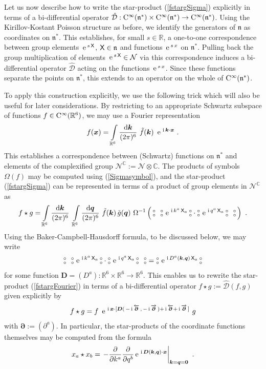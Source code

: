\documentclass[11pt,a4paper]{article}
\newcommand{\NO}{\mbox{$\substack{\circ\\\circ}$}}      %
\newcommand{\mbf}[1]{{\boldsymbol {#1} }}
\def\ii{{\,{\rm i}\,}}
\def\dd{{\rm d}}
\def\CC{{\rm C}}
\def\X{{\sf X}}
\def\mx{{\mbf x}}
\def\mk{{\mbf k}}
\def\mq{{\mbf q}}
\def\mD{{\mbf D}}
\def\mdell{{\mbf\partial}}
\def\mfn{{\mathfrak n}}
\newcommand{\complex}{{\mathbb C}} %
\newcommand{\real}{{\mathbb R}} %
\def\e{{\,\rm e}\,}
\newcommand{\beq}{\begin{eqnarray}}
\newcommand{\eeq}{\end{eqnarray}}
\begin{document}
Let us now describe how to write the star-product (\ref{fstargSigma})
explicitly in terms of a bi-differential operator
$\hat{\mathcal{D}}:\CC^\infty(\mfn^*)\times\CC^\infty(\mfn^*)\to
\CC^\infty(\mfn^*)$. Using the Kirillov-Kostant Poisson structure as
before, we identify the generators of $\mfn$ as coordinates on
$\mfn^*$. This establishes, for small $s\in\real$, a one-to-one
correspondence between group elements $\e^{s\,\X}$, $\X\in\mfn$ and
functions $\e^{s\,x}$ on $\mfn^*$. Pulling back the group
multiplication of elements $\e^{s\,\X}\in\mathcal{N}$ via this
correspondence induces a bi-differential operator $\hat{\mathcal{D}}$
acting on the functions $\e^{s\,x}$. Since these functions separate
the points on $\mfn^*$, this extends to an operator on the whole
of $\CC^\infty(\mfn^*)$.

To apply this construction explicitly, we use the following trick
which will also be useful for later considerations. By restricting to an
appropriate Schwartz subspace of functions $f\in\CC^\infty(\real^6)$,
we may use a Fourier representation
\beq
f(\mx)=\int\limits_{\real^6}\frac{\dd\mk}{(2\pi)^6}~\tilde f(\mk)~
\e^{\ii\mk\cdot\mx} \ .
\label{Fouriertransfdef}\eeq
This establishes a correspondence between (Schwartz) functions on
$\mfn^*$ and elements of the complexified group
$\mathcal{N}^\complex:=\mathcal{N}\otimes\complex$. The products
of symbols $\Omega(f)$ may be computed using (\ref{Sigmasymbol}), and
the star-product (\ref{fstargSigma}) can be represented in terms of a
product of group elements in $\mathcal{N}^\complex$ as
\beq
f\star g=\int\limits_{\real^6}\frac{\dd\mk}{(2\pi)^6}~
\int\limits_{\real^6}\frac{\dd\mq}{(2\pi)^6}~\tilde f(\mk)\,
\tilde g(\mq)~\Omega^{-1}\left(\,\NO~~\NO\,\e^{\ii k^a\,\X_a}\,\NO\cdot
\NO\,\e^{\ii q^a\,\X_a}\,\NO~~\NO\,\right) \ .
\label{fstargFourier}\eeq
Using the Baker-Campbell-Hausdorff formula, to be discussed below, we
may write
\beq
\NO~~\NO\,\e^{\ii k^a\,\X_a}\,\NO\cdot\NO\,\e^{\ii q^a\,\X_a}\,\NO~~\NO=
\NO\,\e^{\ii D^a(\mk,\mq)\,\X_a}\,\NO
\label{NOproductsBCH}\eeq
for some function $\mD=(D^a):\real^6\times\real^6\to\real^6$. This
enables us to rewrite the star-product (\ref{fstargFourier}) in terms
of a bi-differential operator $f\star g:=\hat{\mathcal{D}}(f,g)$ given
explicitly by
\beq
f\star
g=f~\e^{\ii\mx\cdot[\mD(\,-\ii\overleftarrow{\mdell}
\,,\,-\ii\overrightarrow{\mdell}\,)+\ii\overleftarrow{\mdell}+\ii
\overrightarrow{\mdell}\,]}~g
\label{fstargbidiff}\eeq
with $\mdell:=(\partial^a)$. In particular, the star-products of
the coordinate functions themselves may be computed from the formula
\beq
x_a\star x_b=\left.-\frac{\partial}{\partial k^a}\frac\partial
{\partial q^b}\e^{\ii\mD(\mk,\mq)\cdot\mx}\right|_{\mk=\mq=\mbf0} \ .
\label{xastarxb}\eeq
\end{document}

